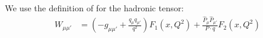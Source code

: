 We use the definition of \cite{Patrignani:2016xqp} for the hadronic tensor:
\begin{align}
W_{\mu\mu'} &= (-g_{\mu\mu'} + \frac{q_\mu q_{\mu'}}{q^2}) F_1(x,Q^2) + \frac{\hat P_\mu \hat P_{\mu'}}{P\cdot q} F_2(x,Q^2)
\end{align}
